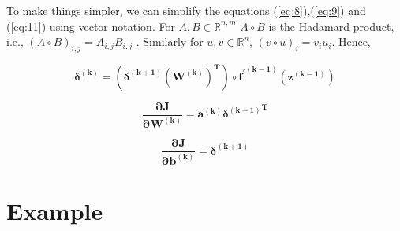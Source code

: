 \documentclass{article}
\begin{document}
To make things simpler, we can simplify the equations (\ref{eq:8}),(\ref{eq:9}) and (\ref{eq:11}) using vector notation. For $A,B \in \mathbb{R}^{n,m}$ $A\circ B$ is the  Hadamard product, i.e., $(A\circ B)_{i,j} = A_{i,j}B_{i,j}$ . Similarly for $u,v \in \mathbb{R}^{n}$, $(v\circ u)_{i} = v_{i}u_{i}$. Hence,  

\begin{equation}\label{eq:8sim}
\bm{\delta^{(k)} = (\delta^{(k+1)} {(W^{(k)})}^{T}) \circ {f^{\prime}}^{(k-1)} (z^{(k-1)})}
\end{equation}

\begin{equation}\label{eq:9sim}
\bm{\frac{\partial J}{\partial  W^{(k)}} = {a^{(k)} \delta^{(k+1)}}^{T}}
\end{equation}

\begin{equation}\label{eq:11sim}
\bm{\frac{\partial J}{\partial  b^{(k)}} =  \delta^{(k+1)}}
\end{equation}

\pagebreak

\section{Example}
\end{document}

